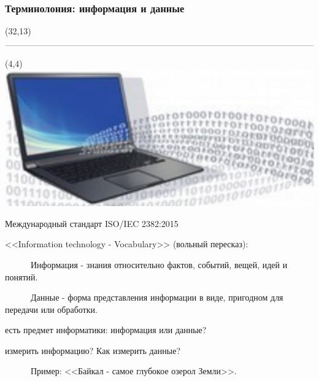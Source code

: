 \documentclass[aspectratio=169, 11pt]{beamer}
\begin{document}
	
	\begin{frame}
		\frametitle{\textbf{\textcolor[rgb]{0.4,0.4,0.4}{\textcolor[rgb]{0,0,1}{Т}ерминолония: информация и данные}}}
		
\begin{textblock}{50}(32,13)
	\includegraphics[scale=0.4]{Screenshot_1.png}
\end{textblock}
		
		\begin{textblock}{50}(4,4)
			\includegraphics[scale=0.25]{Screenshot_2.png}
		\end{textblock}
	
		Международный стандарт ISO/IEC 2382:2015
		
		<<Information technology - Vocabulary>> (вольный пересказ):
		\vspace{2mm}
		
		~~~~~~\textcolor[rgb]{0,0.64,0.09}{Информация} - знания относительно фактов, событий, вещей, идей и понятий.
		
		~~~~~~\textcolor[rgb]{0,0.64,0.09}{Данные} - форма представления информации в виде, пригодном для передачи или обработки.
		\vspace{4mm}
		
		\begin{itemize}
		 есть предмет информатики: информация или данные?
		
		 измерить информацию? Как измерить данные?
		\end{itemize}
		~~~~~~Пример: <<Байкал - самое глубокое озерол Земли>>.
	\end{frame}
	
\end{document}
